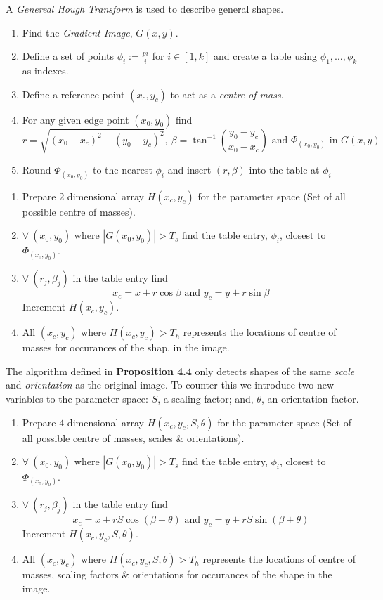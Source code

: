 \documentclass[11pt,a4paper]{article}
\begin{document}
A \textit{Genereal Hough Transform} is used to describe general shapes.
\begin{enumerate}[label=\roman*)]
	\item Find the \textit{Gradient Image}, $G(x,y)$.
	\item Define a set of points $\phi_i:=\frac{pi}{i}$ for $i\in[1,k]$ and create a table using $\phi_1,\dots,\phi_k$ as indexes.
	\item Define a reference point $(x_c,y_c)$ to act as a \textit{centre of mass}.
	\item For any given edge point $(x_0,y_0)$ find
	$$r=\sqrt{(x_0-x_c)^2+(y_0-y_c)^2},\ \beta=\tan^{-1}\left(\dfrac{y_0-y_c}{x_0-x_c}\right)\text{ and }\Phi_{(x_0,y_0)}\text{ in }G(x,y)$$
	\item Round $\Phi_{(x_0,y_0)}$ to the nearest $\phi_i$ and insert $(r,\beta)$ into the table at $\phi_i$
\end{enumerate}

\begin{enumerate}[label=\roman*)]
	\item Prepare $2$ dimensional array $H(x_c,y_c)$ for the parameter space (Set of all possible centre of masses).
	\item $\forall\ (x_0,y_0)$ where $|G(x_0,y_0)|>T_s$ find the table entry, $\phi_i$, closest to $\Phi_{(x_0,y_0)}$.
	\item $\forall\ (r_j,\beta_j)$ in the table entry find
	$$x_c=x+r\cos\beta\text{ and }y_c=y+r\sin\beta$$
	Increment $H(x_c,y_c)$.
	\item All $(x_c,y_c)$ where $H(x_c,y_c)>T_h$ represents the locations of centre of masses for occurances of the shap, in the image.
\end{enumerate}

The algorithm defined in \textbf{Proposition 4.4} only detects shapes of the same \textit{scale} and \textit{orientation} as the original image. To counter this we introduce two new variables to the parameter space: $S$, a scaling factor; and, $\theta$, an orientation factor.
\begin{enumerate}[label=\roman*)]
	\item Prepare $4$ dimensional array $H(x_c,y_c,S,\theta)$ for the parameter space (Set of all possible centre of masses, scales \& orientations).
	\item $\forall\ (x_0,y_0)$ where $|G(x_0,y_0)|>T_s$ find the table entry, $\phi_i$, closest to $\Phi_{(x_0,y_0)}$.
	\item $\forall\ (r_j,\beta_j)$ in the table entry find
	$$x_c=x+rS\cos(\beta+\theta)\text{ and }y_c=y+rS\sin(\beta+\theta)$$
	Increment $H(x_c,y_c,S,\theta)$.
	\item All $(x_c,y_c)$ where $H(x_c,y_c,S,\theta)>T_h$ represents the locations of centre of masses, scaling factors \& orientations for occurances of the shape in the image.
\end{enumerate}
\end{document}

